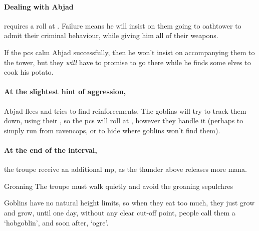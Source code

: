 \begin{multicols}{2}

\paragraph{Dealing with Abjad}
requires a  roll at \tn[9].
Failure means he will insist on them going to \gls{oathtower} to admit their criminal behaviour, while giving him all of their \glspl{weapon}.

If the \glspl{pc} calm Abjad successfully, then he won't insist on accompanying them to the tower, but they \emph{will} have to promise to go there while he finds some elves to cook his potato.

\paragraph{At the slightest hint of aggression,}
Abjad flees and tries to find reinforcements.
The goblins will try to track them down, using their , so the \glspl{pc} will roll at \tn, however they handle it (perhaps  to simply run from \gls{ravencops}, or  to hide where goblins won't find them).

\paragraph{At the end of the \gls{interval},}
the troupe receive an additional \gls{mp}, as the thunder above releases more mana.

{Groaning }%
{The troupe must walk quietly and avoid the groaning sepulchres}%


\begin{exampletext}
  Goblins have no natural height limits, so when they eat too much, they just grow and grow, until one day, without any clear cut-off point, people call them a `hobgoblin', and soon after, `\gls{ogre}'.


\end{exampletext}
\end{multicols}
